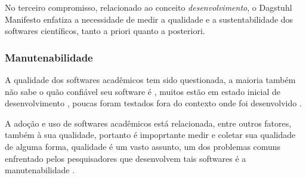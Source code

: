 No terceiro compromisso, relacionado ao conceito {\it desenvolvimento}, o
Dagstuhl Manifesto enfatiza a necessidade de medir a qualidade e a
sustentabilidade dos softwares científicos, tanto a priori quanto a posteriori.


\subsubsection{Manutenabilidade}


A qualidade dos softwares acadêmicos tem sido questionada,
a maioria também não sabe o quão confiável seu software é \cite{Merali2010Computational},
muitos estão em estado inicial de desenvolvimento \cite{marshall2013tools},
poucas foram testados fora do contexto onde foi desenvolvido \cite{Portillo12}.

%

A adoção e uso de softwares acadêmicos está relacionada, entre outros fatores,
também à sua qualidade, portanto é impoprtante medir e coletar sua qualidade de
alguma forma, qualidade é um vasto assunto, um dos problemas comuns enfrentado
pelos pesquisadores que desenvolvem tais softwares é a manutenabilidade
\cite{Prlic2012}.

